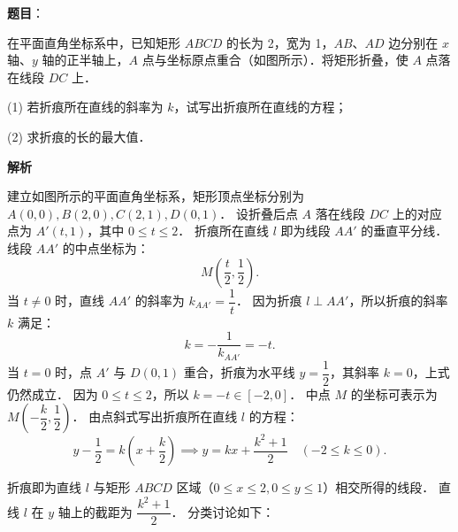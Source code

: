 \begin{answer}

\textbf{题目}：

在平面直角坐标系中，已知矩形 $ABCD$ 的长为 2，宽为 1，$AB$、$AD$ 边分别在 $x$ 轴、$y$ 轴的正半轴上，$A$ 点与坐标原点重合（如图所示）．将矩形折叠，使 $A$ 点落在线段 $DC$ 上．
\nopagebreak[4]
\begin{center}\end{center}
\nopagebreak[4]
(1) 若折痕所在直线的斜率为 $k$，试写出折痕所在直线的方程；

(2) 求折痕的长的最大值．

\textbf{解析}


建立如图所示的平面直角坐标系，矩形顶点坐标分别为 $A(0, 0), B(2, 0), C(2, 1), D(0, 1)$．
设折叠后点 $A$ 落在线段 $DC$ 上的对应点为 $A'(t, 1)$，其中 $0 \leqslant t \leqslant 2$．
折痕所在直线 $l$ 即为线段 $AA'$ 的垂直平分线．
线段 $AA'$ 的中点坐标为：
\nopagebreak[4]
\[
M\left(\frac{t}{2}, \frac{1}{2}\right).
\]
当 $t \neq 0$ 时，直线 $AA'$ 的斜率为 $k_{AA'} = \dfrac{1}{t}$．
因为折痕 $l \perp AA'$，所以折痕的斜率 $k$ 满足：
\nopagebreak[4]
\[
k = -\frac{1}{k_{AA'}} = -t.
\]
当 $t = 0$ 时，点 $A'$ 与 $D(0, 1)$ 重合，折痕为水平线 $y = \dfrac{1}{2}$，其斜率 $k = 0$，上式仍然成立．
因为 $0 \leqslant t \leqslant 2$，所以 $k = -t \in [-2, 0]$．
中点 $M$ 的坐标可表示为 $M\left(-\dfrac{k}{2}, \dfrac{1}{2}\right)$．
由点斜式写出折痕所在直线 $l$ 的方程：
\nopagebreak[4]
\[
y - \frac{1}{2} = k\left(x + \frac{k}{2}\right) \implies y = kx + \frac{k^2 + 1}{2} \quad (-2 \leqslant k \leqslant 0).
\]


折痕即为直线 $l$ 与矩形 $ABCD$ 区域（$0 \leqslant x \leqslant 2, 0 \leqslant y \leqslant 1$）相交所得的线段．
直线 $l$ 在 $y$ 轴上的截距为 $\dfrac{k^2 + 1}{2}$．
分类讨论如下：


\end{answer}
